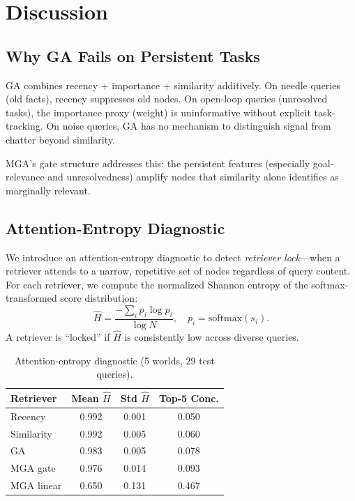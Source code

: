 \documentclass[11pt,a4paper]{article}
\begin{document}
\section{Discussion}

\subsection{Why GA Fails on Persistent Tasks}

GA combines recency + importance + similarity additively. On needle queries (old facts), recency suppresses old nodes. On open-loop queries (unresolved tasks), the importance proxy (weight) is uninformative without explicit task-tracking. On noise queries, GA has no mechanism to distinguish signal from chatter beyond similarity.

MGA's gate structure addresses this: the persistent features (especially goal-relevance and unresolvedness) amplify nodes that similarity alone identifies as marginally relevant.

\subsection{Attention-Entropy Diagnostic}

We introduce an attention-entropy diagnostic to detect \emph{retriever lock}---when a retriever attends to a narrow, repetitive set of nodes regardless of query content. For each retriever, we compute the normalized Shannon entropy of the softmax-transformed score distribution:
\[
\hat{H} = \frac{-\sum_i p_i \log p_i}{\log N}, \quad p_i = \text{softmax}(s_i).
\]
A retriever is ``locked'' if $\hat{H}$ is consistently low across diverse queries.

\begin{table}[h]
\centering
\caption{Attention-entropy diagnostic (5 worlds, 29 test queries).}
\begin{tabular}{lccc}
\toprule
\textbf{Retriever} & \textbf{Mean $\hat{H}$} & \textbf{Std $\hat{H}$} & \textbf{Top-5 Conc.} \\
\midrule
Recency & 0.992 & 0.001 & 0.050 \\
Similarity & 0.992 & 0.005 & 0.060 \\
GA & 0.983 & 0.005 & 0.078 \\
MGA gate & 0.976 & 0.014 & 0.093 \\
MGA linear & 0.650 & 0.131 & 0.467 \\
\bottomrule
\end{tabular}
\end{table}
\end{document}
